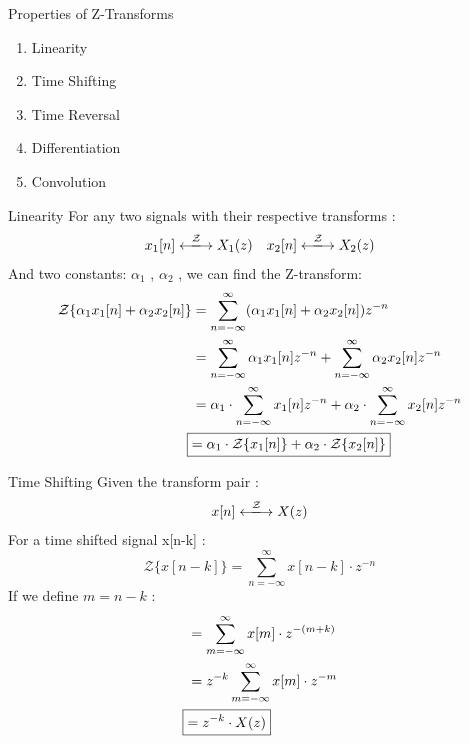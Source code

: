 \documentclass{beamer}
\begin{document}
\begin{frame}{Properties of Z-Transforms}
    \begin{enumerate}
        \item Linearity
        \item Time Shifting
        \item Time Reversal
        \item Differentiation
        \item Convolution
    \end{enumerate}
\end{frame}

\begin{frame}{Linearity}
    For any two signals with their respective transforms :
    \begin{align*}
        x_1[n] \xlongleftrightarrow{ \mathcal{Z} } X_1(z) \quad
        x_2[n] \xlongleftrightarrow{ \mathcal{Z} } X_2(z)
    \end{align*}
    And two constants: $\alpha_1$ , $\alpha_2$ , we can find the Z-transform:
    \begin{align*}
        \mathcal{Z}\{\alpha_1 x_1[n] + \alpha_2 x_2[n]\} &= \sum_{n=-\infty}^{\infty} (\alpha_1 x_1[n] + \alpha_2 x_2[n])z^{-n} \\
            &= \sum_{n=-\infty}^{\infty} \alpha_1 x_1[n]z^{-n} +  \sum_{n=-\infty}^{\infty} \alpha_2 x_2[n]z^{-n} \\
            &= \alpha_1 \cdot \sum_{n=-\infty}^{\infty} x_1[n]z^{-n} + \alpha_2 \cdot \sum_{n=-\infty}^{\infty} x_2[n]z^{-n} \\
            \Aboxed{&= \alpha_1 \cdot \mathcal{Z}\{x_1[n]\} + \alpha_2 \cdot \mathcal{Z} \{x_2[n]\}} \\
    \end{align*} 

\end{frame}

\begin{frame}{Time Shifting}
    Given the transform pair : 
    \begin{align*}
        x[n] \xlongleftrightarrow{ \mathcal{Z} } X(z)
    \end{align*}
    For a time shifted signal x[n-k] : 
    \[ \mathcal{Z}\{ x[n-k] \} = \sum_{n=-\infty}^{\infty}  x[n-k] \cdot z^{-n} \]
    If we define $m = n - k$ :
    \begin{align*}
        &= \sum_{m=-\infty}^{\infty}  x[m] \cdot z^{-(m+k)} \\
        &= z^{-k} \sum_{m=-\infty}^{\infty}  x[m] \cdot z^{-m} \\
        \Aboxed{&= z^{-k} \cdot X(z)}
    \end{align*}
\end{frame}
\end{document}
